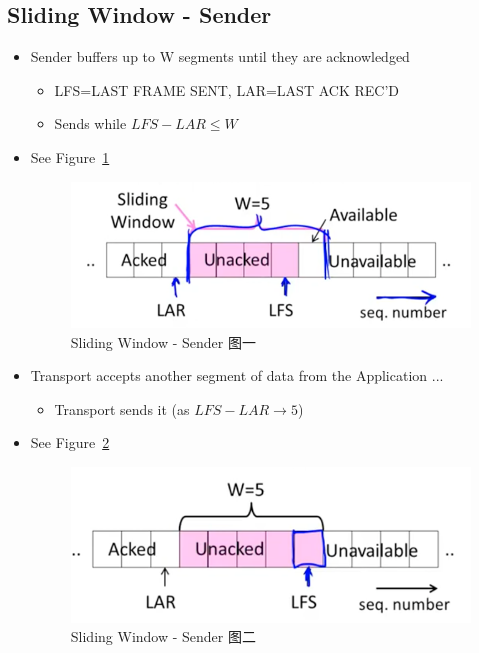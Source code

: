 \documentclass[12pt]{ctexart}   %
\begin{document}
	\subsection{Sliding Window - Sender}
	\begin{itemize}
		\item Sender buffers up to W segments until they are acknowledged
		\begin{itemize}
			\item LFS=LAST FRAME SENT, LAR=LAST ACK REC'D
			\item Sends while $LFS - LAR \leq W$
		\end{itemize}
		\item See Figure~\ref{fig:6-5-4}
		  
		 \begin{figure}[h!] %
		\centering
		 \includegraphics[scale=0.7]{images/6-5-4}
		\caption{  Sliding Window - Sender 图一}
		 \label{fig:6-5-4}
		 \end{figure}
		 
		 \item Transport accepts another segment of data from the Application ...
		 \begin{itemize}
		 	\item Transport sends it (as $LFS - LAR \rightarrow 5$)
		 \end{itemize}
		 \item See Figure~\ref{fig:6-5-5}
		  
		 \begin{figure}[h!] %
		\centering
		 \includegraphics[scale=0.7]{images/6-5-5}
		\caption{  Sliding Window - Sender 图二}
		 \label{fig:6-5-5}
		 \end{figure}
		 

\end{itemize}
\end{document}
